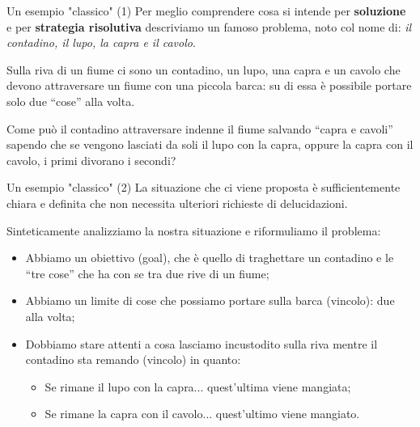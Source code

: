 \documentclass[
    notheorems,
    11pt,
    compress,
    aspectratio=169
]{beamer}
\begin{document}
\begin{frame}{Un esempio "classico" (1)}
    Per meglio comprendere cosa si intende per \textbf{soluzione} e per \textbf{strategia risolutiva} descriviamo un famoso problema, noto col nome di: \textit{il contadino, il lupo, la capra e il cavolo}.

    \pause
    \vspace{0.5cm}

    Sulla riva di un fiume ci sono un contadino, un lupo, una capra e un cavolo che devono attraversare un fiume con una piccola barca: su di essa è possibile portare solo due “cose” alla volta.

    \pause
    \vspace{0.5cm}

    Come può il contadino attraversare indenne il fiume salvando “capra e cavoli” sapendo che se vengono lasciati da soli il lupo con la capra, oppure la capra con il cavolo, i primi divorano i secondi?
\end{frame}

\begin{frame}{Un esempio "classico" (2)}
    La situazione che ci viene proposta è sufficientemente chiara e definita che non necessita ulteriori richieste di delucidazioni.

    \vspace{0.25cm}

    Sinteticamente analizziamo la nostra situazione e riformuliamo il problema:

    \begin{itemize}
        \item Abbiamo un obiettivo (goal), che è quello di traghettare un contadino e le “tre cose” che ha con se tra due rive di un fiume;

        \item Abbiamo un limite di cose che possiamo portare sulla barca (vincolo): due alla volta;

        \item Dobbiamo stare attenti a cosa lasciamo incustodito sulla riva mentre il contadino sta remando (vincolo) in quanto:

        \begin{itemize}
            \item Se rimane il lupo con la capra... quest’ultima viene mangiata;

            \item Se rimane la capra con il cavolo... quest’ultimo viene mangiato.
        \end{itemize}
    \end{itemize}
\end{frame}
\end{document}
